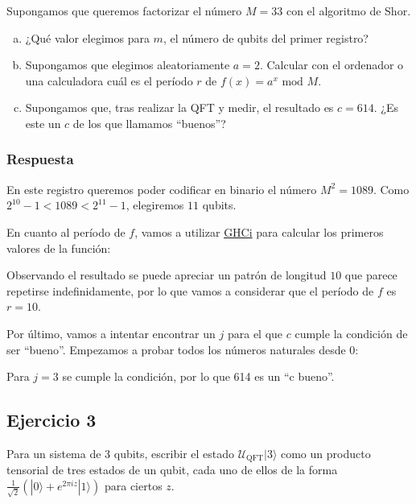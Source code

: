 \documentclass{article}
\begin{document}
Supongamos que queremos factorizar el número $M = 33$ con el
algoritmo de Shor.

\begin{enumerate}[(a)]
  \item ¿Qué valor elegimos para $m$, el número de qubits del primer
    registro?
  \item Supongamos que elegimos aleatoriamente $a = 2$. Calcular con
    el ordenador o una calculadora cuál es el período $r$ de $f(x)
    = a^x \text{ mod } M$.
  \item Supongamos que, tras realizar la QFT y medir, el resultado
    es $c = 614$. ¿Es este un $c$ de los que llamamos ``buenos''?
\end{enumerate}

\subsubsection*{Respuesta}

En este registro queremos poder codificar en binario el número $M^2
= 1089$. Como $2^{10} - 1 < 1089 < 2^{11} - 1$, elegiremos $11$
qubits.

En cuanto al período de $f$, vamos a utilizar
\href{http://downloads.haskell.org/~ghc/latest/docs/html/users_guide/ghci.html#using-ghci}{GHCi}
para calcular los primeros valores de la función:





Observando el resultado se puede apreciar un patrón de longitud $10$
que parece repetirse indefinidamente, por lo que vamos a considerar
que el período de $f$ es $r = 10$.

Por último, vamos a intentar encontrar un $j$ para el que $c$ cumple
la condición de ser ``bueno''. Empezamos a probar todos los números
naturales desde $0$:





Para $j = 3$ se cumple la condición, por lo que 614 es un ``c
bueno''.

\subsection*{Ejercicio 3}

Para un sistema de 3 qubits, escribir el estado
$\mathcal{U}_\text{QFT}|3\rangle$ como un producto tensorial de tres
estados de un qubit, cada uno de ellos de la forma
$\frac{1}{\sqrt{2}}(|0\rangle + e^{2\pi i z}|1\rangle)$ para ciertos
$z$.
\end{document}
